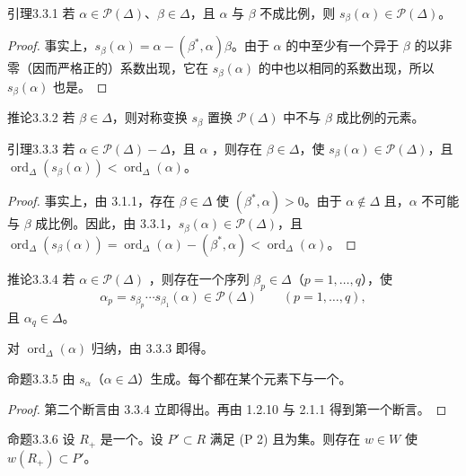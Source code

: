 \begin{SGAresult}{引理}{3.3.1}
若 $\alpha\in\mathscr P(\Delta)$、$\beta\in\Delta$，且 $\alpha$ 与 $\beta$ 不成比例，则 $s_\beta(\alpha)\in\mathscr P(\Delta)$。
\end{SGAresult}
\begin{proof}
事实上，$s_\beta(\alpha)=\alpha-(\beta^*,\alpha)\beta$。由于 $\alpha$ 的中至少有一个异于 $\beta$ 的以非零（因而严格正的）系数出现，它在 $s_\beta(\alpha)$ 的中也以相同的系数出现，所以 $s_\beta(\alpha)$ 也是。
\end{proof}
\begin{SGAresult}{推论}{3.3.2}
若 $\beta\in\Delta$，则对称变换 $s_\beta$ 置换 $\mathscr P(\Delta)$ 中不与 $\beta$ 成比例的元素。
\end{SGAresult}
\begin{SGAresult}{引理}{3.3.3}
若 $\alpha\in\mathscr P(\Delta)-\Delta$，且 $\alpha$ ，则存在 $\beta\in\Delta$，使 $s_\beta(\alpha)\in\mathscr P(\Delta)$，且 $\operatorname{ord}_\Delta(s_\beta(\alpha))<\operatorname{ord}_\Delta(\alpha)$。
\end{SGAresult}
\begin{proof}
事实上，由 3.1.1，存在 $\beta\in\Delta$ 使 $(\beta^*,\alpha)>0$。由于 $\alpha\notin\Delta$ 且，$\alpha$ 不可能与 $\beta$ 成比例。因此，由 3.3.1，$s_\beta(\alpha)\in\mathscr P(\Delta)$，且 $\operatorname{ord}_\Delta(s_\beta(\alpha))=\operatorname{ord}_\Delta(\alpha)-(\beta^*,\alpha)<\operatorname{ord}_\Delta(\alpha)$。
\end{proof}
\begin{SGAresult}{推论}{3.3.4}
若 $\alpha\in\mathscr P(\Delta)$ ，则存在一个序列 $\beta_p\in\Delta$（$p=1,\ldots,q$），使
\[\alpha_p=s_{\beta_p}\cdots s_{\beta_1}(\alpha)\in\mathscr P(\Delta)\qquad(p=1,\ldots,q),\]
且 $\alpha_q\in\Delta$。
\end{SGAresult}
对 $\operatorname{ord}_\Delta(\alpha)$ 归纳，由 3.3.3 即得。
\begin{SGAresult}{命题}{3.3.5}
由 $s_\alpha$（$\alpha\in\Delta$）生成。每个都在某个元素下与一个。
\end{SGAresult}
\begin{proof}
第二个断言由 3.3.4 立即得出。再由 1.2.10 与 2.1.1 得到第一个断言。
\end{proof}
\begin{SGAresult}{命题}{3.3.6}
设 $R_+$ 是一个。设 $P'\subset R$ 满足 (P 2) 且为集。则存在 $w\in W$ 使 $w(R_+)\subset P'$。
\end{SGAresult}

